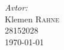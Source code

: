 \documentclass[slovene,11pt,a4paper]{article}
\numberwithin{equation}{section} %
\numberwithin{figure}{section} %
\numberwithin{table}{section} %
\begin{document}
\begin{titlepage}



\Large \emph{Avtor:}\\
Klemen \textsc{Rahne}\\
28152028\\[2cm]

{\large \today } \\[0.5cm] %

	

\end{titlepage}
%
%
%
%
%
%
\end{document}
